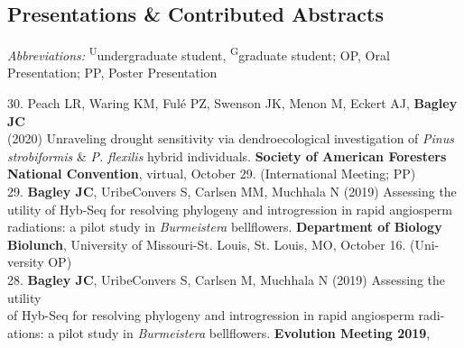 \documentclass[margin,line]{res}
\begin{document}
\begin{resume}

\section{\sc Presentations \& Contributed Abstracts}

\emph{Abbreviations:} \textsuperscript{U}undergraduate student, \textsuperscript{G}graduate student; OP, Oral Presentation; PP, Poster Presentation

30. Peach LR, Waring KM, Ful\'{e} PZ, Swenson JK, Menon M, Eckert AJ, \textbf{Bagley JC} \\
\hspace*{8mm} (2020) Unraveling drought sensitivity via dendroecological investigation of \emph{Pinus} \\
\hspace*{8mm} \emph{strobiformis} \& \emph{P. flexilis} hybrid individuals. \textbf{Society of American Foresters} \\ \vspace{2mm}
\hspace*{8mm}\textbf{National Convention}, virtual, October 29. (International Meeting; PP) \\
29. \textbf{Bagley JC}, Uribe\textendash Convers S, Carlsen MM, Muchhala N (2019) Assessing the\\
\hspace*{8mm} utility of Hyb-Seq for resolving phylogeny and introgression in rapid angiosperm\\
\hspace*{8mm} radiations: a pilot study in \emph{Burmeistera} bellflowers. \textbf{Department of Biology}\\
\hspace*{8mm} \textbf{Biolunch}, University of Missouri-St. Louis, St. Louis, MO, October 16. (Uni-\\ \vspace{2mm}
\hspace*{8mm}versity OP) \\
28. \textbf{Bagley JC}, Uribe\textendash Convers S, Carlsen M, Muchhala N (2019) Assessing the utility\\
\hspace*{8mm} of Hyb-Seq for resolving phylogeny and introgression in rapid angiosperm radi-\\
\hspace*{8mm} ations: a pilot study in \emph{Burmeistera} bellflowers. \textbf{Evolution Meeting 2019},\\ \vspace{2mm}

\end{resume}
\end{document}
